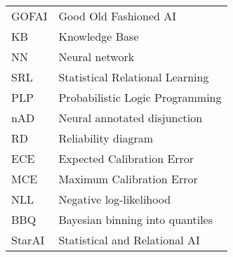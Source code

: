 \begin{flushleft}
\renewcommand{\arraystretch}{1.1}
\begin{tabularx}{\textwidth}{@{}p{12mm}X@{}}
GOFAI & Good Old Fashioned AI \\
KB & Knowledge Base \\
NN & Neural network \\
SRL & Statistical Relational Learning \\
PLP & Probabilistic Logic Programming \\
nAD & Neural annotated disjunction \\
RD & Reliability diagram \\
ECE & Expected Calibration Error \\
MCE & Maximum Calibration Error \\
NLL & Negative log-likelihood \\
BBQ & Bayesian binning into quantiles \\
StarAI & Statistical and Relational AI
\end{tabularx}
\end{flushleft}